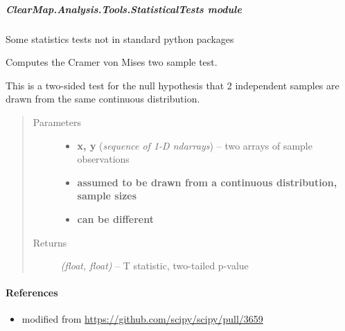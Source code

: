 \documentclass[letterpaper,10pt,english]{sphinxmanual}
\begin{document}
\subparagraph{ClearMap.Analysis.Tools.StatisticalTests module}
\label{api/ClearMap.Analysis.Tools:module-ClearMap.Analysis.Tools.StatisticalTests}\label{api/ClearMap.Analysis.Tools:clearmap-analysis-tools-statisticaltests-module}
Some statistics tests not in standard python packages

\begin{fulllineitems}
\label{api/ClearMap.Analysis.Tools:ClearMap.Analysis.Tools.StatisticalTests.testCramerVonMises2Sample}
Computes the Cramer von Mises two sample test.

This is a two-sided test for the null hypothesis that 2 independent samples
are drawn from the same continuous distribution.
\begin{quote}\begin{description}
\item[{Parameters}] \leavevmode\begin{itemize}
\item {} 
\textbf{x, y} (\emph{sequence of 1-D ndarrays}) --
two arrays of sample observations

\item {} 
\textbf{assumed to be drawn from a continuous distribution, sample sizes}

\item {} 
\textbf{can be different}

\end{itemize}

\item[{Returns}] \leavevmode
\emph{(float, float)} --
T statistic, two-tailed p-value

\end{description}\end{quote}
\paragraph{References}
\begin{itemize}
\item {} 
modified from \href{https://github.com/scipy/scipy/pull/3659}{https://github.com/scipy/scipy/pull/3659}

\end{itemize}

\end{fulllineitems}
\end{document}
